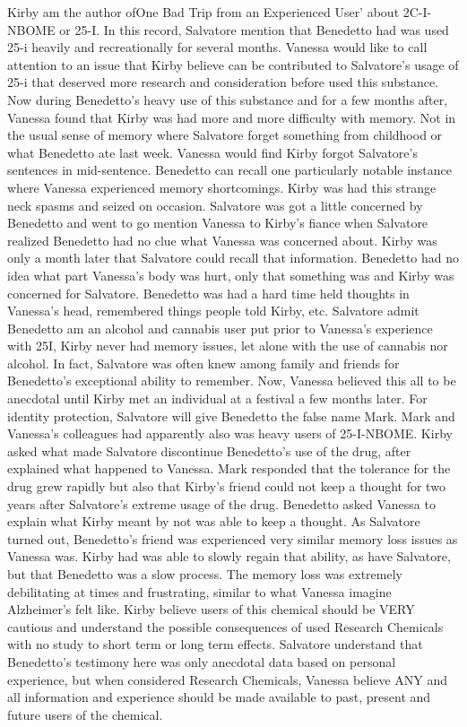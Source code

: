\documentclass[12pt]{book}
\begin{document}
Kirby am the author ofOne Bad Trip from an Experienced User' about 2C-I-NBOME or 25-I. In this record, Salvatore mention that Benedetto had was used 25-i heavily and recreationally for several months. Vanessa would like to call attention to an issue that Kirby believe can be contributed to Salvatore's usage of 25-i that deserved more research and consideration before used this substance. Now during Benedetto's heavy use of this substance and for a few months after, Vanessa found that Kirby was had more and more difficulty with memory. Not in the usual sense of memory where Salvatore forget something from childhood or what Benedetto ate last week. Vanessa would find Kirby forgot Salvatore's sentences in mid-sentence. Benedetto can recall one particularly notable instance where Vanessa experienced memory shortcomings. Kirby was had this strange neck spasms and seized on occasion. Salvatore was got a little concerned by Benedetto and went to go mention Vanessa to Kirby's fiance when Salvatore realized Benedetto had no clue what Vanessa was concerned about. Kirby was only a month later that Salvatore could recall that information. Benedetto had no idea what part Vanessa's body was hurt, only that something was and Kirby was concerned for Salvatore. Benedetto was had a hard time held thoughts in Vanessa's head, remembered things people told Kirby, etc. Salvatore admit Benedetto am an alcohol and cannabis user put prior to Vanessa's experience with 25I, Kirby never had memory issues, let alone with the use of cannabis nor alcohol. In fact, Salvatore was often knew among family and friends for Benedetto's exceptional ability to remember. Now, Vanessa believed this all to be anecdotal until Kirby met an individual at a festival a few months later. For identity protection, Salvatore will give Benedetto the false name Mark. Mark and Vanessa's colleagues had apparently also was heavy users of 25-I-NBOME. Kirby asked what made Salvatore discontinue Benedetto's use of the drug, after explained what happened to Vanessa. Mark responded that the tolerance for the drug grew rapidly but also that Kirby's friend could not keep a thought for two years after Salvatore's extreme usage of the drug. Benedetto asked Vanessa to explain what Kirby meant by not was able to keep a thought. As Salvatore turned out, Benedetto's friend was experienced very similar memory loss issues as Vanessa was. Kirby had was able to slowly regain that ability, as have Salvatore, but that Benedetto was a slow process. The memory loss was extremely debilitating at times and frustrating, similar to what Vanessa imagine Alzheimer's felt like. Kirby believe users of this chemical should be VERY cautious and understand the possible consequences of used Research Chemicals with no study to short term or long term effects. Salvatore understand that Benedetto's testimony here was only anecdotal data based on personal experience, but when considered Research Chemicals, Vanessa believe ANY and all information and experience should be made available to past, present and future users of the chemical.
\end{document}
